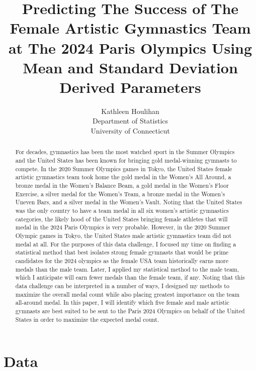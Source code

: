 \documentclass[12pt]{article}
\title{Predicting The Success of The Female Artistic Gymnastics Team at The 2024 Paris Olympics Using Mean and 
Standard Deviation Derived Parameters}
\author{Kathleen Houlihan\\
  Department of Statistics\\
  University of Connecticut
}
\begin{document}
\maketitle

\begin{abstract}
    For decades, gymnastics has been the most watched sport in the Summer Olympics and the United States 
    has been known for bringing gold medal-winning gymnasts to compete. In the 2020 
    Summer Olympics games in Tokyo, the United States female artistic gymnastics team took home 
    the gold medal in the Women's All Around, a bronze medal in the Women's Balance 
    Beam, a gold medal in the Women's Floor Exercise, a silver medal for the Women's
    Team, a bronze medal in the Women's Uneven Bars, and a silver medal in the Women's Vault. 
    Noting that the United States was the only country to have a team medal in all six women's artistic gymnastics 
    categories, the likely hood of the United States bringing female athletes that will medal in the 2024 
    Paris Olympics is very probable. However, in the 2020 Summer Olympic games in Tokyo, the United States 
    male artistic gymnastics team did not medal at all. For the purposes of this data challenge, I focused my 
    time on finding a statistical method that best isolates strong female gymnasts that would be prime candidates 
    for the 2024 olympics as the female USA team historically earns more medals than the male team. Later, I applied 
    my statistical method to the male team, which I anticipate will earn fewer medals than the female team, if any. 
    Noting that this data challenge can be interpreted in a number of ways, I designed my methods to maximize the 
    overall medal count while also placing greatest importance on the team all-around medal. In this paper, I will 
    identify which five female and male artistic gymnasts are best suited to be sent to the Paris 2024 
    Olympics on behalf of the United States in order to maximize the expected medal count. 

\end{abstract}


\section{Data}
\label{sec:data}
\end{document}

